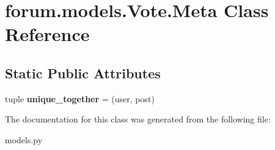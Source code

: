 \hypertarget{classforum_1_1models_1_1_vote_1_1_meta}{}\section{forum.\+models.\+Vote.\+Meta Class Reference}
\label{classforum_1_1models_1_1_vote_1_1_meta}
\subsection*{Static Public Attributes}
\begin{DoxyCompactItemize}
\item 
\mbox{\label{classforum_1_1models_1_1_vote_1_1_meta_aea51375916b3bd63dff0d8f65d1d305f}} 
tuple {\bfseries unique\+\_\+together} = (\textquotesingle{}user\textquotesingle{}, \textquotesingle{}post\textquotesingle{})
\end{DoxyCompactItemize}


The documentation for this class was generated from the following file\+:\begin{DoxyCompactItemize}
\item 
models.\+py\end{DoxyCompactItemize}
